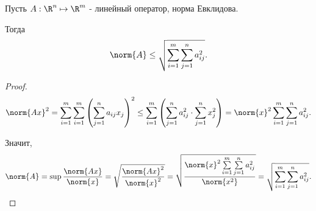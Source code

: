 \begin{theorem}\label{q25_th2.29} \thmslashn

    Пусть $A : \R^{n} \mapsto \R^{m}$ - линейный оператор, норма Евклидова.

    Тогда
    \[ \norm{A} \le \sqrt{\sum\limits_{i=1}^{m}\sum\limits_{j=1}^{n} a_{ij}^2}  .\]
    \begin{proof} \thmslashn
    
        \[ \norm{Ax}^2 = \sum\limits_{i=1}^{m} \sum\limits_{i=1}^{m} \left( \sum\limits_{j=1}^{n} a_{ij}x_{j} \right)^2 \le \sum\limits_{i=1}^{m}\left( \sum\limits_{j=1}^{n} a_{ij}^2 \cdot \sum\limits_{j=1}^{n} x_{j}^2 \right) = \norm{x}^2 \sum\limits_{i=1}^{m}\sum\limits_{j=1}^{n} a_{ij}^2  .\]

        Значит,
        \[ \norm{A} = \sup \frac{\norm{Ax}}{\norm{x}} = \sqrt{\frac{\norm{Ax}^2}{\norm{x}^2}} = \sqrt{\frac{\norm{x}^2 \sum\limits_{i=1}^{m} \sum\limits_{j=1}^{n} a_{ij}^2}{\norm{x^2}}} = \sqrt{\sum\limits_{i=1}^{m} \sum\limits_{j=1}^{n} a_{ij}^2}    .\qedhere\] 
    \end{proof}
\end{theorem}
